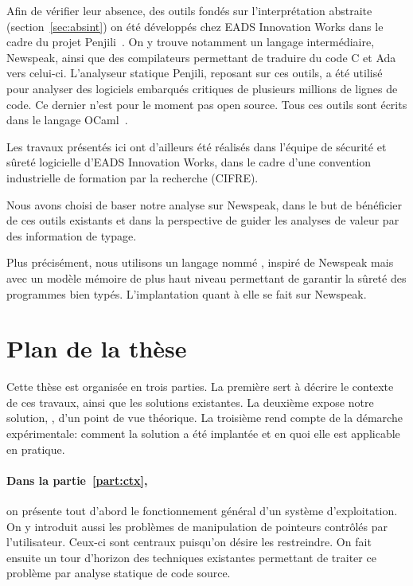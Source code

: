 Afin de vérifier leur absence, des outils fondés sur l'interprétation abstraite
(section~\ref{sec:absint}) on été développés chez EADS Innovation Works dans le
cadre du projet Penjili~. On y trouve notamment un langage
intermédiaire, Newspeak\cite{newspeak}, ainsi que des compilateurs permettant de
traduire du code C et Ada vers celui-ci. L'analyseur statique Penjili, reposant
sur ces outils, a été utilisé pour analyser des logiciels embarqués critiques de
plusieurs millions de lignes de code. Ce dernier n'est pour le moment pas open
source. Tous ces outils sont écrits dans le langage OCaml~\cite{DAOC}.

Les travaux présentés ici ont d'ailleurs été réalisés dans l'équipe de sécurité
et sûreté logicielle d'EADS Innovation Works, dans le cadre d'une convention
industrielle de formation par la recherche (CIFRE).

Nous avons choisi de baser notre analyse sur Newspeak, dans le but de bénéficier
de ces outils existants et dans la perspective de guider les analyses de valeur
par des information de typage.

Plus précisément, nous utilisons un langage nommé \langname, inspiré de Newspeak
mais avec un modèle mémoire de plus haut niveau permettant de garantir la sûreté
des programmes bien typés. L'implantation quant à elle se fait sur Newspeak.

\section{Plan de la thèse}

Cette thèse est organisée en trois parties. La première sert à décrire le
contexte de ces travaux, ainsi que les solutions existantes. La deuxième expose
notre solution, \langname, d'un point de vue théorique. La troisième rend compte
de la démarche expérimentale: comment la solution a été implantée et en quoi
elle est applicable en pratique.

\paragraph{Dans la partie~\ref{part:ctx},} on présente tout d'abord le
fonctionnement général d'un système d'exploitation. On y introduit aussi les
problèmes de manipulation de pointeurs contrôlés par l'utilisateur. Ceux-ci sont
centraux puisqu'on désire les restreindre. On fait ensuite un tour d'horizon des
techniques existantes permettant de traiter ce problème par analyse statique de
code source.

